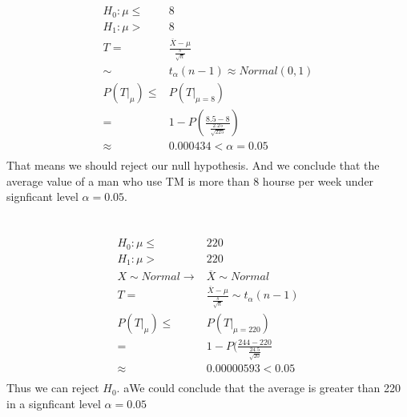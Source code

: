 \documentclass{article}
\begin{document}
    \section{}
        \paragraph{}
        \begin{equation*}
            \begin{split}
                H_0: \mu\leq& 8\\
                H_1: \mu>&8\\
                T=&\frac{\overline{X}-\mu}{\frac{s}{\sqrt{n}}}\\
                    \sim& t_\alpha(n-1)\approx Normal(0,1)\\
                P(T|_\mu)\leq &P(T|_{\mu=8})\\
                    =&1-P(\frac{8.5-8}{\frac{2.25}{\sqrt{225}}})\\
                    \approx&0.000434<\alpha=0.05\\
            \end{split}
        \end{equation*}
        That means we should reject our null hypothesis. And we conclude that the average value of a man who use TM is more than 8 hourse per week under signficant level $\alpha=0.05$.
    \section{}
        \paragraph{}
        \begin{equation*}
            \begin{split}
                H_0: \mu\leq& 220\\
                H_1: \mu>&220\\
                X\sim Normal\rightarrow&\overline{X}\sim Normal\\
                T=&\frac{\overline{X}-\mu}{\frac{s}{\sqrt{n}}}\sim t_\alpha(n-1)\\
                P(T|_\mu)\leq&P(T|_{\mu=220})\\
                    =&1-P(\frac{244-220}{\frac{24.5}{\sqrt{20}}}\\
                    \approx&0.00000593<0.05\\
            \end{split}
        \end{equation*}
        Thus we can reject $H_0$. aWe could conclude that the average is greater than 220 in a signficant level $\alpha=0.05$
\end{document}
